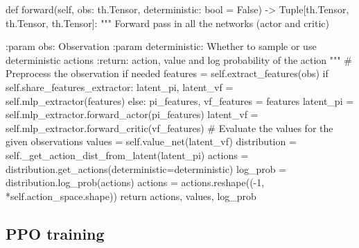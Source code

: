 \documentclass[
  letterpaper,
  DIV=11,
  numbers=noendperiod]{scrartcl}
\newenvironment{Shaded}{\begin{snugshade}}{\end{snugshade}}
\newcommand{\BuiltInTok}[1]{\textcolor[rgb]{0.00,0.23,0.31}{#1}}
\newcommand{\CommentTok}[1]{\textcolor[rgb]{0.37,0.37,0.37}{#1}}
\newcommand{\ControlFlowTok}[1]{\textcolor[rgb]{0.00,0.23,0.31}{#1}}
\newcommand{\DecValTok}[1]{\textcolor[rgb]{0.68,0.00,0.00}{#1}}
\newcommand{\KeywordTok}[1]{\textcolor[rgb]{0.00,0.23,0.31}{#1}}
\newcommand{\NormalTok}[1]{\textcolor[rgb]{0.00,0.23,0.31}{#1}}
\newcommand{\OperatorTok}[1]{\textcolor[rgb]{0.37,0.37,0.37}{#1}}
\newcommand{\VariableTok}[1]{\textcolor[rgb]{0.07,0.07,0.07}{#1}}
\begin{document}
\begin{Shaded}
\begin{Highlighting}[]
\KeywordTok{def}\NormalTok{ forward(}\VariableTok{self}\NormalTok{, obs: th.Tensor, deterministic: }\BuiltInTok{bool} \OperatorTok{=} \VariableTok{False}\NormalTok{) }\OperatorTok{{-}\textgreater{}}\NormalTok{ Tuple[th.Tensor, th.Tensor, th.Tensor]:}
    \CommentTok{"""}
\CommentTok{    Forward pass in all the networks (actor and critic)}

\CommentTok{    :param obs: Observation}
\CommentTok{    :param deterministic: Whether to sample or use deterministic actions}
\CommentTok{    :return: action, value and log probability of the action}
\CommentTok{    """}
    \CommentTok{\# Preprocess the observation if needed}
\NormalTok{    features }\OperatorTok{=} \VariableTok{self}\NormalTok{.extract\_features(obs)}
    \ControlFlowTok{if} \VariableTok{self}\NormalTok{.share\_features\_extractor:}
\NormalTok{        latent\_pi, latent\_vf }\OperatorTok{=} \VariableTok{self}\NormalTok{.mlp\_extractor(features)}
    \ControlFlowTok{else}\NormalTok{:}
\NormalTok{        pi\_features, vf\_features }\OperatorTok{=}\NormalTok{ features}
\NormalTok{        latent\_pi }\OperatorTok{=} \VariableTok{self}\NormalTok{.mlp\_extractor.forward\_actor(pi\_features)}
\NormalTok{        latent\_vf }\OperatorTok{=} \VariableTok{self}\NormalTok{.mlp\_extractor.forward\_critic(vf\_features)}
    \CommentTok{\# Evaluate the values for the given observations}
\NormalTok{    values }\OperatorTok{=} \VariableTok{self}\NormalTok{.value\_net(latent\_vf)}
\NormalTok{    distribution }\OperatorTok{=} \VariableTok{self}\NormalTok{.\_get\_action\_dist\_from\_latent(latent\_pi)}
\NormalTok{    actions }\OperatorTok{=}\NormalTok{ distribution.get\_actions(deterministic}\OperatorTok{=}\NormalTok{deterministic)}
\NormalTok{    log\_prob }\OperatorTok{=}\NormalTok{ distribution.log\_prob(actions)}
\NormalTok{    actions }\OperatorTok{=}\NormalTok{ actions.reshape((}\OperatorTok{{-}}\DecValTok{1}\NormalTok{, }\OperatorTok{*}\VariableTok{self}\NormalTok{.action\_space.shape))}
    \ControlFlowTok{return}\NormalTok{ actions, values, log\_prob}
\end{Highlighting}
\end{Shaded}

\hypertarget{ppo-training}{%
\subsection{PPO training}\label{ppo-training}}
\end{document}
